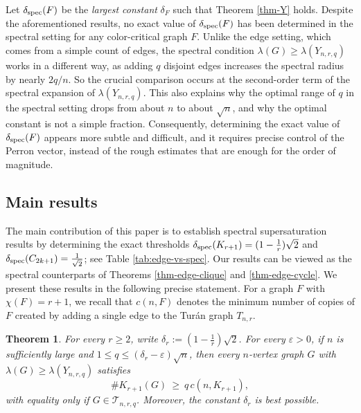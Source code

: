 \documentclass[11pt,a4paper]{article}
\newtheorem{theorem}{Theorem}[section]
\theoremstyle{definition}
\theoremstyle{plain}
\renewcommand{\le}{\leqslant}
\renewcommand{\ge}{\geqslant}
\begin{document}
\smallskip 
Let $\delta_{\rm spec} (F)$ be the {\it largest constant} $\delta_F$  such that Theorem \ref{thm-Y} holds. 
Despite the aforementioned results, no exact value of $\delta_{\rm spec} (F)$ has been determined in the spectral
setting for any color-critical graph $F$.   
Unlike the edge setting, which comes from a simple count of edges, the spectral condition $\lambda(G)\ge\lambda(Y_{n,r,q})$ works in a different way, as adding $q$ disjoint edges increases the spectral radius by nearly $2q/n$. So the crucial comparison occurs at the second-order term of the spectral expansion of $\lambda(Y_{n,r,q})$. This also explains why the optimal range of $q$ in the spectral setting drops from about $n$ to about $\sqrt n$, and why the optimal constant is not a simple fraction. Consequently, determining the exact value of $\delta_{\rm spec}(F)$ appears more subtle and difficult, and it requires precise control of the Perron vector, instead of the rough estimates that are enough for the order
of magnitude.   



\subsection{Main results}


The main contribution of this paper is to establish 
spectral supersaturation results by determining the exact thresholds $\delta_{\rm spec}(K_{r+1}) =(1-\frac{1}{r})\sqrt{2} $ and $\delta_{\rm spec}(C_{2k+1}) = \frac{1}{\sqrt{2}}$; see Table \ref{tab:edge-vs-spec}.     
Our results can be viewed as the spectral counterparts of Theorems \ref{thm-edge-clique} and \ref{thm-edge-cycle}.  
We present these results in the following precise statement. 
 For a graph $F$ with $\chi (F)=r+1$, 
 we recall that $c(n,F)$ denotes the minimum number of copies of $F$ created by adding a single edge to the Tur\'{a}n graph $T_{n,r}$. 



\begin{theorem} 
\label{thm-cliques}
For every $r\ge 2$, write  
$ \delta_r :=(1-\frac{1}{r})\sqrt{2}$.  
 For every  $\varepsilon>0$, if $n$ is sufficiently large and $ 1\le q\le (\delta_r -\varepsilon)\sqrt n$, 
then every $n$-vertex graph $G$ with 
$ \lambda(G)\ge \lambda(Y_{n,r,q})$ 
satisfies 
$$ \texttt{\#}K_{r+1}(G)\ \ge \ q\,c(n,K_{r+1}),$$
 with equality  only if $G\in \mathcal{T}_{n,r,q}$. 
Moreover, the constant $\delta_r$ is best possible. 
\end{theorem}
\end{document}
